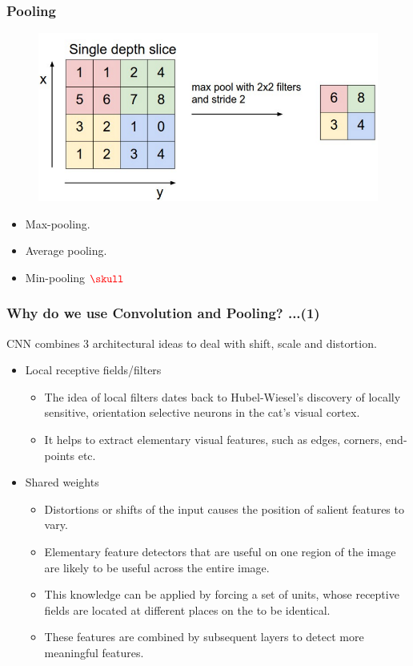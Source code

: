 \documentclass{beamer}
\newcommand*{\mathcolor}{}
\def\mathcolor#1#{\mathcoloraux{#1}}
\newcommand*{\mathcoloraux}[3]{%
  \protect\leavevmode
  \begingroup
    \color#1{#2}#3%
  \endgroup
}
\begin{document}
\begin{frame}
	\frametitle{Pooling}
	\begin{figure}
		\includegraphics[scale=0.23]{./figures/edit/max_pool_short.png}
	\end{figure}	
		\begin{itemize}
		\item Max-pooling.
		\item Average pooling.
		\pause
		\item Min-pooling 
		\pause
		$\mathcolor{red}{ \skull } $
	\end{itemize}	
\end{frame}

\begin{frame}
	\frametitle{Why do we use Convolution and Pooling? ...(1)}
	CNN combines 3 architectural ideas to deal with shift, scale and distortion.
	\begin{itemize}
		\item Local receptive fields/filters 
		\begin{itemize}
			\item The idea of local filters dates back to Hubel-Wiesel's discovery of locally sensitive, orientation selective neurons in the cat's visual cortex.
			\item It helps to extract elementary visual features, such as edges, corners, end-points etc. 
		\end{itemize}
		\item Shared weights
		\begin{itemize}
			\item Distortions or shifts of the input causes the position of salient features to vary.			
			\item Elementary feature detectors that are useful on one region of the image are likely to be useful across the entire image. 
			\item This knowledge can be applied by forcing a set of units, whose receptive fields are located at different places on the to be identical.
			\item These features are combined by subsequent layers to detect more meaningful features.			
		\end{itemize}
	\end{itemize}
\end{frame}
\end{document}
